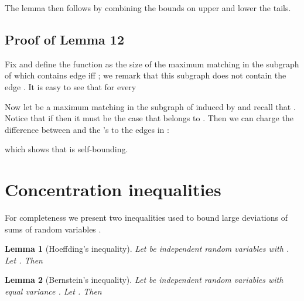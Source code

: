 \documentclass[12pt]{article}
\newtheorem{lemma}{Lemma}
\begin{document}
		The lemma then follows by combining the bounds on upper and lower the tails.


	\subsection{Proof of Lemma 12}
	
			
			Fix  and define the function  as the size of the maximum matching in the subgraph of  which contains edge  iff ; we remark that this subgraph does not contain the edge . It is easy to see that for every   
			
			Now let  be a maximum matching in the subgraph of  induced by  and recall that . Notice that if  then it must be the case that  belongs to . Then we can charge the difference between  and the 's to the edges in :

	which shows that  is self-bounding.




	\section{Concentration inequalities}
	
		For completeness we present two inequalities used to bound large deviations of sums of random variables \cite{BoucheronLB03}.
	
		\begin{lemma}[Hoeffding's inequality] \label{hoeffding}
		Let  be independent random variables with . Let . Then

	\end{lemma}

	\begin{lemma}[Bernstein's inequality] \label{bernIneq}
		Let  be independent random variables with equal variance . Let . Then

	\end{lemma}

		
		
		
\end{document}

